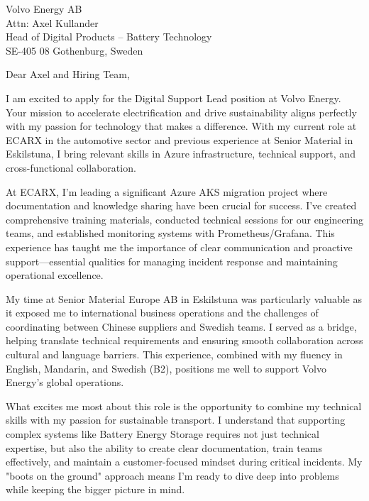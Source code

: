 \documentclass[a4paper,10pt]{article}
\begin{document}
\pagestyle{empty} %

\begin{letter}{\color{darkblue}
Volvo Energy AB\\
Attn: Axel Kullander\\
Head of Digital Products – Battery Technology\\
SE-405 08 Gothenburg, Sweden}

\vspace{30pt}

\opening{Dear Axel and Hiring Team,}

\vspace{8pt}

I am excited to apply for the Digital Support Lead position at Volvo Energy. Your mission to accelerate electrification and drive sustainability aligns perfectly with my passion for technology that makes a difference. With my current role at ECARX in the automotive sector and previous experience at Senior Material in Eskilstuna, I bring relevant skills in Azure infrastructure, technical support, and cross-functional collaboration.

At ECARX, I'm leading a significant Azure AKS migration project where documentation and knowledge sharing have been crucial for success. I've created comprehensive training materials, conducted technical sessions for our engineering teams, and established monitoring systems with Prometheus/Grafana. This experience has taught me the importance of clear communication and proactive support—essential qualities for managing incident response and maintaining operational excellence.

My time at Senior Material Europe AB in Eskilstuna was particularly valuable as it exposed me to international business operations and the challenges of coordinating between Chinese suppliers and Swedish teams. I served as a bridge, helping translate technical requirements and ensuring smooth collaboration across cultural and language barriers. This experience, combined with my fluency in English, Mandarin, and Swedish (B2), positions me well to support Volvo Energy's global operations.

What excites me most about this role is the opportunity to combine my technical skills with my passion for sustainable transport. I understand that supporting complex systems like Battery Energy Storage requires not just technical expertise, but also the ability to create clear documentation, train teams effectively, and maintain a customer-focused mindset during critical incidents. My "boots on the ground" approach means I'm ready to dive deep into problems while keeping the bigger picture in mind.


\end{letter}
\end{document}
